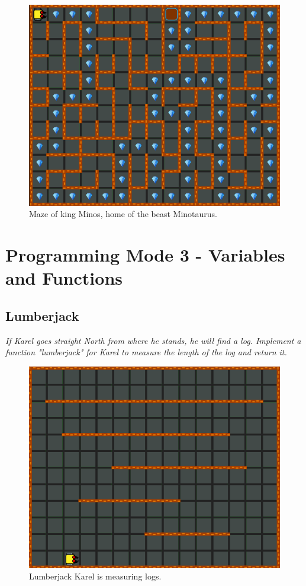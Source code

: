 \begin{figure}[!ht]
\begin{center}
\includegraphics[height=0.4\textwidth]{img/f14.png}
\end{center}
\vspace{-4mm}
\caption{Maze of king Minos, home of the beast Minotaurus.}
\label{fig:f14}
\end{figure}


\newpage

\section{Programming Mode 3 - Variables and Functions}

\subsection{Lumberjack}

{\em If Karel goes straight North from where he stands, he will find a log. Implement a function "lumberjack" for Karel to measure the length of the log and return it.}\\[-7mm]


\begin{figure}[!ht]
\begin{center}
\includegraphics[height=0.4\textwidth]{img/h01.png}
\end{center}
\vspace{-4mm}
\caption{Lumberjack Karel is measuring logs.}
\vspace{-1cm}
\label{fig:h01}
\end{figure}

